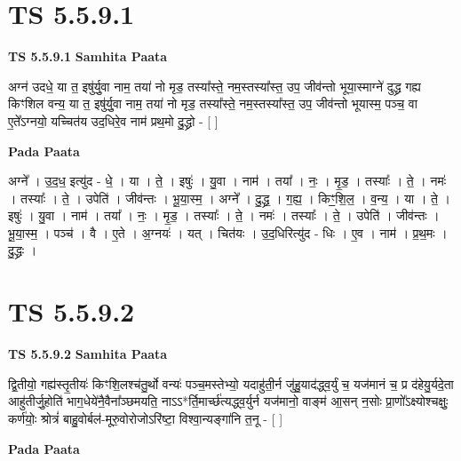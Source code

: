 \documentclass[17pt]{extarticle}
\begin{document}
\section*{ TS 5.5.9.1 }

\textbf{TS 5.5.9.1 } \newline
\textbf{Samhita Paata} \newline

अग्न॑ उदधे॒ या त॒ इषु॑र्यु॒वा नाम॒ तया॑ नो मृड॒ तस्या᳚स्ते॒ नम॒स्तस्या᳚स्त॒ उप॒ जीव॑न्तो भूया॒स्माग्ने॑ दुद्ध्र गह्य किꣳशिल वन्य॒ या त॒ इषु॑र्यु॒वा नाम॒ तया॑ नो मृड॒ तस्या᳚स्ते॒ नम॒स्तस्या᳚स्त॒ उप॒ जीव॑न्तो भूयास्म॒ पञ्च॒ वा ए॒ते᳚ऽग्नयो॒ यच्चित॑य उद॒धिरे॒व नाम॑ प्रथ॒मो दु॒द्ध्रो - [  ] \newline

\textbf{Pada Paata} \newline

अग्ने᳚ । उ॒द॒ध॒ इत्यु॑द - धे॒ । या । ते॒ । इषुः॑ । यु॒वा । नाम॑ । तया᳚ । नः॒ । मृ॒ड॒ । तस्याः᳚ । ते॒ । नमः॑ । तस्याः᳚ । ते॒ । उपेति॑ । जीव॑न्तः । भू॒या॒स्म॒ । अग्ने᳚ । दु॒द्ध्र॒ । ग॒ह्य॒ । किꣳ॒॒शि॒ल॒ । व॒न्य॒ । या । ते॒ । इषुः॑ । यु॒वा । नाम॑ । तया᳚ । नः॒ । मृ॒ड॒ । तस्याः᳚ । ते॒ । नमः॑ । तस्याः᳚ । ते॒ । उपेति॑ । जीव॑न्तः । भू॒या॒स्म॒ । पञ्च॑ । वै । ए॒ते । अ॒ग्नयः॑ । यत् । चित॑यः । उ॒द॒धिरित्यु॑द - धिः । ए॒व । नाम॑ । प्र॒थ॒मः । दु॒द्ध्रः ।  \newline




\section*{ TS 5.5.9.2 }

\textbf{TS 5.5.9.2 } \newline
\textbf{Samhita Paata} \newline

द्वि॒तीयो॒ गह्य॑स्तृ॒तीयः॑ किꣳशि॒लश्च॑तु॒र्थो वन्यः॑ पञ्च॒मस्तेभ्यो॒ यदाहु॑ती॒र्न जु॑हु॒याद॑द्ध्व॒र्युं च॒ यज॑मानं च॒ प्र द॑हेयु॒र्यदे॒ता आहु॑तीर्जु॒होति॑ भाग॒धेये॑नै॒वैना᳚ञ्छमयति॒ नाऽऽ*र्ति॒मार्च्छ॑त्यद्ध्व॒र्युर्न यज॑मानो॒ वाङ्म॑ आ॒सन् न॒सोः प्रा॒णो᳚ऽक्ष्योश्चक्षुः॒ कर्ण॑योः॒ श्रोत्रं॑ बाहु॒वोर्बल॑-मूरु॒वोरोजोऽरि॑ष्टा॒ विश्वा॒न्यङ्गा॑नि त॒नू - [  ] \newline

\textbf{Pada Paata} \newline
\end{document}
